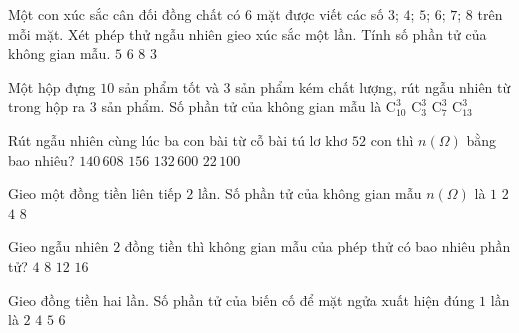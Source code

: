 \begin{ex}%
	Một con xúc sắc cân đối đồng chất có $6$ mặt được viết các số $3$; $4$; $5$; $6$; $7$; $8$ trên mỗi mặt. Xét phép thử ngẫu nhiên gieo xúc sắc một lần. Tính số phần tử của không gian  mẫu.
	 \choice
		{$5$} 
		 {\True $6$}
		 {$8$}
		{$3$} 
\end{ex}

\begin{ex}%
	Một hộp  đựng $10$ sản phẩm tốt và $3$ sản phẩm kém chất lượng, rút ngẫu nhiên từ trong hộp ra $3$ sản phẩm. Số phần tử của không gian mẫu là
	 \choice
		 {$\mathrm{C}_{10}^3$}
		 {$\mathrm{C}_3^3$}
		 {$\mathrm{C}_7^3$}
		 {\True $\mathrm{C}_{13}^3$}
\end{ex}

\begin{ex}%
	Rút ngẫu nhiên cùng lúc ba con bài từ cỗ  bài tú lơ khơ $52$ con thì $n(\Omega)$ bằng bao nhiêu?
	\choice 
		{$140\,608$} 
		{$156$} 
		 {$132\,600$}
		{\True $22\,100$} 
\end{ex}

\begin{ex}%
	Gieo một đồng tiền liên tiếp $2$ lần. Số phần tử của không gian mẫu $n(\Omega)$ là 
	 \choice
		{$1$} 
		 {$2$}
		{\True  $4$}
		{$8$} 
\end{ex}

\begin{ex}%
	Gieo ngẫu nhiên $2$ đồng tiền thì không gian mẫu của phép thử có bao  nhiêu phần tử?
	 \choice
		 {\True $4$}
		 {$8$}
		 {$12$}
		 {$16$}
\end{ex}

\begin{ex}%
	Gieo đồng tiền hai lần. Số phần tử của biến cố để mặt ngửa xuất  hiện đúng $1$ lần là
	\choice 
		 {\True $2$}
		{$4$} 
		 {$5$}
		 {$6$}
\end{ex}

